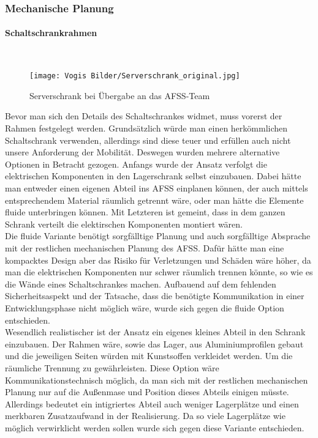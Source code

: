 \subsubsection{Mechanische Planung}

    \paragraph{Schaltschrankrahmen}\mbox{}\\
    \begin{figure}[h]
        \centering
        \texttt{[image: Vogis Bilder/Serverschrank\_original.jpg]}
        \caption{Serverschrank bei Übergabe an das AFSS-Team}
        \label{fig:Serverschrank_original}
    \end{figure}
    Bevor man sich den Details des Schaltschrankes widmet, muss vorerst der Rahmen festgelegt werden. Grundsätzlich würde man einen herkömmlichen Schaltschrank verwenden, allerdings sind diese teuer und erfüllen auch nicht unsere Anforderung der Mobilität. Deswegen wurden mehrere alternative Optionen in Betracht gezogen. Anfangs wurde der Ansatz verfolgt die elektrischen Komponenten in den Lagerschrank selbst einzubauen. Dabei hätte man entweder einen eigenen Abteil ins AFSS einplanen können, der auch mittels entsprechendem Material räumlich getrennt wäre, oder man hätte die Elemente fluide unterbringen können. Mit Letzteren ist gemeint, dass in dem ganzen Schrank verteilt die elektirschen Komponenten montiert wären.\\
    Die fluide Variante benötigt sorgfälltige Planung und auch sorgfälltige Absprache mit der restlichen mechanischen Planung des AFSS. Dafür hätte man eine kompacktes Design aber das Risiko für Verletzungen und Schäden wäre höher, da man die elektrischen Komponenten nur schwer räumlich trennen könnte, so wie es die Wände eines Schaltschrankes machen. Aufbauend auf dem fehlenden Sicherheitsaspekt und der Tatsache, dass die benötigte Kommunikation in einer Entwicklungsphase nicht möglich wäre, wurde sich gegen die fluide Option entschieden.\\
    Wesendlich realistischer ist der Ansatz ein eigenes kleines Abteil in den Schrank einzubauen. Der Rahmen wäre, sowie das Lager, aus Aluminiumprofilen gebaut und die jeweiligen Seiten würden mit Kunstsoffen verkleidet werden. Um die räumliche Trennung zu gewährleisten. Diese Option wäre Kommunikationstechnisch möglich, da man sich mit der restlichen mechanischen Planung nur auf die Außenmase und Position dieses Abteils einigen müsste. Allerdings bedeutet ein intigriertes Abteil auch weniger Lagerplätze und einen merkbaren Zusatzaufwand in der Realisierung. Da so viele Lagerplätze wie möglich verwirklicht werden sollen wurde sich gegen diese Variante entschieden.\\

